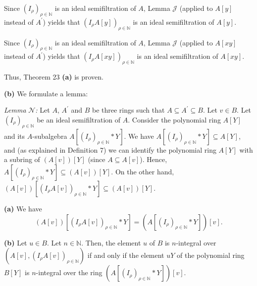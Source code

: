 \documentclass[12pt,final,notitlepage,onecolumn]{article}%
\begin{document}
Since $\left(  I_{\rho}\right)  _{\rho\in\mathbb{N}}$ is an ideal
semifiltration of $A$, Lemma $\mathcal{J}$ (applied to $A\left[  y\right]  $
instead of $A^{\prime}$) yields that $\left(  I_{\rho}A\left[  y\right]
\right)  _{\rho\in\mathbb{N}}$ is an ideal semifiltration of $A\left[
y\right]  $.

Since $\left(  I_{\rho}\right)  _{\rho\in\mathbb{N}}$ is an ideal
semifiltration of $A$, Lemma $\mathcal{J}$ (applied to $A\left[  xy\right]  $
instead of $A^{\prime}$) yields that $\left(  I_{\rho}A\left[  xy\right]
\right)  _{\rho\in\mathbb{N}}$ is an ideal semifiltration of $A\left[
xy\right]  $.

Thus, Theorem 23 \textbf{(a)} is proven.

\textbf{(b)} We formulate a lemma:

\textit{Lemma} $\mathcal{N}$\textit{:} Let $A$, $A^{\prime}$ and $B$ be three
rings such that $A\subseteq A^{\prime}\subseteq B$. Let $v\in B$. Let $\left(
I_{\rho}\right)  _{\rho\in\mathbb{N}}$ be an ideal semifiltration of $A$.
Consider the polynomial ring $A\left[  Y\right]  $ and its $A$-subalgebra
$A\left[  \left(  I_{\rho}\right)  _{\rho\in\mathbb{N}}\ast Y\right]  $. We
have $A\left[  \left(  I_{\rho}\right)  _{\rho\in\mathbb{N}}\ast Y\right]
\subseteq A\left[  Y\right]  $, and (as explained in Definition 7) we can
identify the polynomial ring $A\left[  Y\right]  $ with a subring of $\left(
A\left[  v\right]  \right)  \left[  Y\right]  $ (since $A\subseteq A\left[
v\right]  $). Hence, $A\left[  \left(  I_{\rho}\right)  _{\rho\in\mathbb{N}%
}\ast Y\right]  \subseteq\left(  A\left[  v\right]  \right)  \left[  Y\right]
$. On the other hand, $\left(  A\left[  v\right]  \right)  \left[  \left(
I_{\rho}A\left[  v\right]  \right)  _{\rho\in\mathbb{N}}\ast Y\right]
\subseteq\left(  A\left[  v\right]  \right)  \left[  Y\right]  $.

\textbf{(a)} We have%
\[
\left(  A\left[  v\right]  \right)  \left[  \left(  I_{\rho}A\left[  v\right]
\right)  _{\rho\in\mathbb{N}}\ast Y\right]  =\left(  A\left[  \left(  I_{\rho
}\right)  _{\rho\in\mathbb{N}}\ast Y\right]  \right)  \left[  v\right]  .
\]


\textbf{(b)} Let $u\in B$. Let $n\in\mathbb{N}$. Then, the element $u$ of $B$
is $n$-integral over $\left(  A\left[  v\right]  ,\left(  I_{\rho}A\left[
v\right]  \right)  _{\rho\in\mathbb{N}}\right)  $ if and only if the element
$uY$ of the polynomial ring $B\left[  Y\right]  $ is $n$-integral over the
ring $\left(  A\left[  \left(  I_{\rho}\right)  _{\rho\in\mathbb{N}}\ast
Y\right]  \right)  \left[  v\right]  $.
\end{document}
